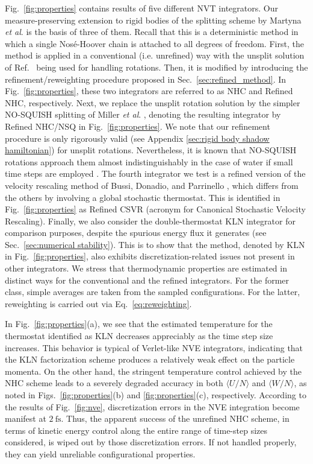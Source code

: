 \documentclass[
	aip,
	jcp,
	reprint,
]{revtex4-1}
\begin{document}
Fig.~\ref{fig:properties} contains results of five different NVT integrators.
Our measure-preserving extension to rigid bodies of the splitting scheme by Martyna \textit{et al}. \cite{Martyna_1996} is the basis of three of them.
Recall that this is a deterministic method in which a single Nos\'{e}-Hoover chain \cite{Martyna_1992} is attached to all degrees of freedom.
First, the method is applied in a conventional (i.e. unrefined) way with the unsplit solution of Ref.~ being used for handling rotations.
Then, it is modified by introducing the refinement/reweighting procedure proposed in Sec.~\ref{sec:refined_method}.
In Fig.~\ref{fig:properties}, these two integrators are referred to as NHC and Refined NHC, respectively.
Next, we replace the unsplit rotation solution by the simpler NO-SQUISH splitting of Miller \textit{et al}. \cite{Miller_2002}, denoting the resulting integrator by Refined NHC/NSQ in Fig.~\ref{fig:properties}.
We note that our refinement procedure is only rigorously valid (see Appendix \ref{sec:rigid body shadow hamiltonian}) for unsplit rotations.
Nevertheless, it is known that NO-SQUISH rotations approach them almost indistinguishably in the case of water if small time steps are employed \cite{Silveira_2017}.
The fourth integrator we test is a refined version of the velocity rescaling method of Bussi, Donadio, and Parrinello \cite{Bussi_2007}, which differs from the others by involving a global stochastic thermostat.
This is identified in Fig.~\ref{fig:properties} as Refined CSVR (acronym for Canonical Stochastic Velocity Rescaling).
Finally, we also consider the double-thermostat KLN integrator \cite{Kamberaj_2005} for comparison purposes, despite the spurious energy flux it generates (see Sec.~\ref{sec:numerical stability}).
This is to show that the method, denoted by KLN in Fig.~\ref{fig:properties}, also exhibits discretization-related issues not present in other integrators.
We stress that thermodynamic properties are estimated in distinct ways for the conventional and the refined integrators.
For the former class, simple averages are taken from the sampled configurations.
For the latter, reweighting is carried out via Eq.~\eqref{eq:reweighting}.

In Fig.~\ref{fig:properties}(a), we see that the estimated temperature for the thermostat identified as KLN decreases appreciably as the time step size increases.
This behavior is typical of Verlet-like NVE integrators\cite{Davidchack_2010, Silveira_2017}, indicating that the KLN factorization scheme \cite{Kamberaj_2005} produces a relatively weak effect on the particle momenta.
On the other hand, the stringent temperature control achieved by the NHC scheme leads to a severely degraded accuracy in both $\langle U/N \rangle$ and $\langle W/N \rangle$, as noted in Figs.~\ref{fig:properties}(b) and \ref{fig:properties}(c), respectively.
According to the results of Fig.~\ref{fig:nve}, discretization errors in the NVE integration become manifest at $2~\text{fs}$.
Thus, the apparent success of the unrefined NHC scheme, in terms of kinetic energy control along the entire range of time-step sizes considered, is wiped out by those discretization errors.
If not handled properly, they can yield unreliable configurational properties.
\end{document}
